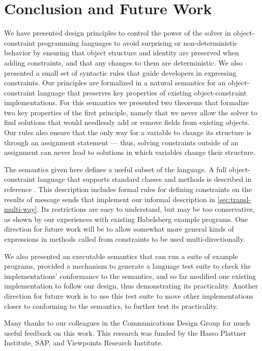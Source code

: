 \documentclass[10pt,reprint]{sigplanconf-preprint}
\begin{document}
\section{Conclusion and Future Work}
\label{sec:conclusion}

We have presented design principles to control the power of the solver
in object-constraint programming languages to avoid surprising or
non-deterministic behavior by ensuring that object structure and
identity are preserved when adding constraints, and that any changes
to them are deterministic. We also presented a small set of syntactic
rules that guide developers in expressing constraints. Our principles
are formalized in a natural semantics for an object-constraint
language that preserves key properties of existing object-constraint
implementations. For this semantics we presented two theorems that
formalize two key properties of the first principle, namely that we
never allow the solver to find solutions that would needlessly add or
remove fields from existing objects. Our rules also ensure that the
only way for a variable to change its structure is through an
assignment statement --- thus, solving constraints outside of an
assignment can never lead to solutions in which variables change their
structure.

The semantics given here defines a useful subset of the language. A
full object-constraint language that supports standard classes and
methods is described in reference \cite{felgentreff:2015:semantics}.
This description includes formal rules for
defining constraints on the results of message sends that implement
our informal description in \autoref{sec:transl-multi-way}. Its
restrictions are easy to understand, but may be too conservative, as
shown by our experiences with existing Babelsberg example
programs. One direction for future work will be to allow somewhat more
general kinds of expressions in methods called from constraints to be
used multi-directionally.

We also presented an executable semantics that can run a suite of
example programs, provided a mechanism to generate a language test
suite to check the implementations' conformance to the semantics, and
so far modified one existing implementation to follow our design, thus
demonstrating its practicality. Another direction for future work is to
use this test suite to move other implementations closer to conforming
to the semantics, to further test its practicality.

\acks Many thanks to our colleagues in the Communications \linebreak
Design Group for much useful feedback on this work.  This research was
funded by the Hasso Plattner Institute, SAP, and Viewpoints Research
Institute.




\balance

% 
\end{document}
